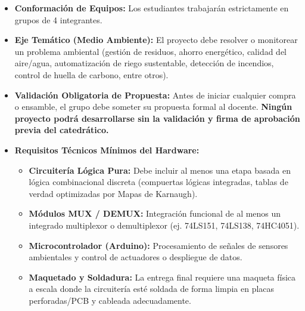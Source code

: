 \documentclass[11pt,letterpaper]{article}
\begin{document}
\begin{itemize}[leftmargin=1.5em,label=\cuadrado,itemsep=0.35em,topsep=0.1em]
  \item \textbf{Conformación de Equipos:} Los estudiantes trabajarán estrictamente en grupos de 4 integrantes.
  \item \textbf{Eje Temático (Medio Ambiente):} El proyecto debe resolver o monitorear un problema ambiental (gestión de residuos, ahorro energético, calidad del aire/agua, automatización de riego sustentable, detección de incendios, control de huella de carbono, entre otros).
  \item \textbf{Validación Obligatoria de Propuesta:} Antes de iniciar cualquier compra o ensamble, el grupo debe someter su propuesta formal al docente. \textbf{Ningún proyecto podrá desarrollarse sin la validación y firma de aprobación previa del catedrático.}
  \item \textbf{Requisitos Técnicos Mínimos del Hardware:}
  \begin{itemize}[leftmargin=1.5em,label=$\circ$,itemsep=0.25em,topsep=0.15em]
    \item \textbf{Circuitería Lógica Pura:} Debe incluir al menos una etapa basada en lógica combinacional discreta (compuertas lógicas integradas, tablas de verdad optimizadas por Mapas de Karnaugh).
    \item \textbf{Módulos MUX / DEMUX:} Integración funcional de al menos un integrado multiplexor o demultiplexor (ej. 74LS151, 74LS138, 74HC4051).
    \item \textbf{Microcontrolador (Arduino):} Procesamiento de señales de sensores ambientales y control de actuadores o despliegue de datos.
    \item \textbf{Maquetado y Soldadura:} La entrega final requiere una maqueta física a escala donde la circuitería esté soldada de forma limpia en placas perforadas/PCB y cableada adecuadamente.
  \end{itemize}
\end{itemize}

\vspace{0.5em}
\par

\clearpage

\end{document}

